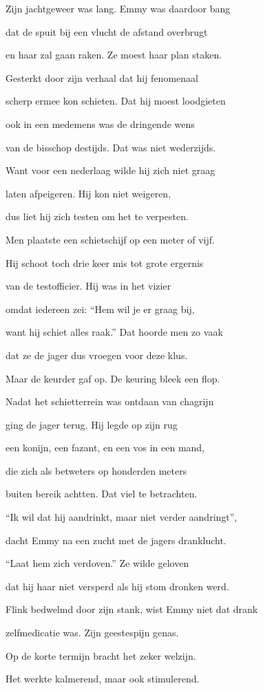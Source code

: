 Zijn jachtgeweer was lang.
Emmy was daardoor bang

dat de spuit bij een vlucht
de afstand overbrugt

en haar zal gaan raken.
Ze moest haar plan staken.

Gesterkt door zijn verhaal
dat hij fenomenaal

scherp ermee kon schieten.
Dat hij moest loodgieten

ook in een medemens
was de dringende wens

van de bisschop destijds.
Dat was niet wederzijds.

Want voor een nederlaag
wilde hij zich niet graag

laten afpeigeren.
Hij kon niet weigeren,

dus liet hij zich testen
om het te verpesten.

Men plaatste een schietschijf
op een meter of vijf.

Hij schoot toch drie keer mis
tot grote ergernis

van de testofficier.
Hij was in het vizier

omdat iedereen zei:
“Hem wil je er graag bij,

want hij schiet alles raak.”
Dat hoorde men zo vaak

dat ze de jager dus
vroegen voor deze klus.

Maar de keurder gaf op.
De keuring bleek een flop.

Nadat het schietterrein
was ontdaan van chagrijn

ging de jager terug.
Hij legde op zijn rug

een konijn, een fazant,
en een vos in een mand,

die zich als betweters
op honderden meters

buiten bereik achtten.
Dat viel te betrachten.

“Ik wil dat hij aandrinkt,
maar niet verder aandringt”,

dacht Emmy na een zucht
met de jagers dranklucht.

“Laat hem zich verdoven.”
Ze wilde geloven

dat hij haar niet versperd
als hij stom dronken werd.

Flink bedwelmd door zijn stank,
wist Emmy niet dat drank

zelfmedicatie was.
Zijn geestespijn genas.

Op de korte termijn
bracht het zeker welzijn.

Het werkte kalmerend,
maar ook stimulerend.

